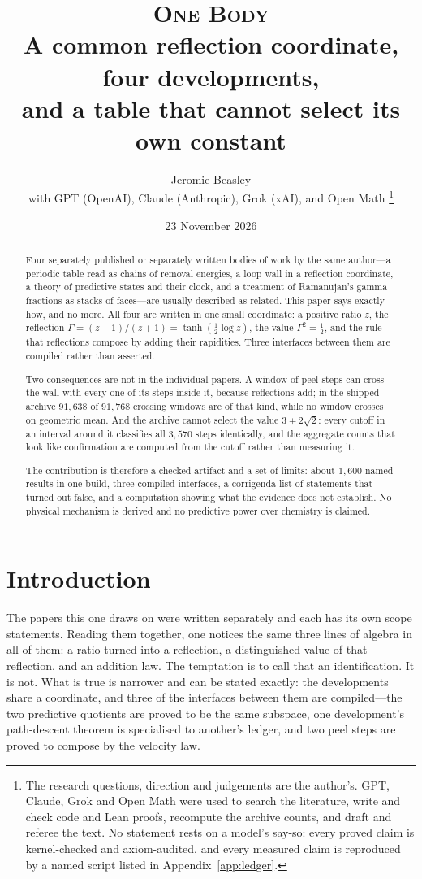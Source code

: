 \documentclass[11pt]{article}
\title{\textsc{One Body}\\A common reflection coordinate, four developments,\\and a table that cannot select its own constant}
\author{Jeromie Beasley\\[3pt]
{\small with GPT (OpenAI), Claude (Anthropic), Grok (xAI), and Open Math}%
\thanks{The research questions, direction and judgements are the author's. GPT, Claude, Grok and
Open Math were used to search the literature, write and check code and Lean proofs, recompute the
archive counts, and draft and referee the text. No statement rests on a model's say-so: every
proved claim is kernel-checked and axiom-audited, and every measured claim is reproduced by a
named script listed in Appendix~\ref{app:ledger}.}}
\date{23 November 2026}
\newcommand{\G}{\Gamma}
\renewcommand{\_}{\origunderscore\allowbreak}
\newcommand{\W}{3+2\sqrt{2}}
\begin{document}
\maketitle

\begin{abstract}
\noindent
Four separately published or separately written bodies of work by the same author---a periodic
table read as chains of removal energies, a loop wall in a reflection coordinate, a theory of
predictive states and their clock, and a treatment of Ramanujan's gamma fractions as stacks of
faces---are usually described as related. This paper says exactly how, and no more. All four are
written in one small coordinate: a positive ratio $z$, the reflection
$\G=(z-1)/(z+1)=\tanh(\tfrac12\log z)$, the value $\G^2=\tfrac12$, and the rule that reflections
compose by adding their rapidities. Three interfaces between them are compiled rather than
asserted.

Two consequences are not in the individual papers. A window of peel steps can cross the wall with
every one of its steps inside it, because reflections add; in the shipped archive $91{,}638$ of
$91{,}768$ crossing windows are of that kind, while no window crosses on geometric mean. And the
archive cannot select the value $\W$: every cutoff in an interval around it classifies all
$3{,}570$ steps identically, and the aggregate counts that look like confirmation are computed
from the cutoff rather than measuring it.

The contribution is therefore a checked artifact and a set of limits: about $1{,}600$ named
results in one build, three compiled interfaces, a corrigenda list of statements that turned out
false, and a computation showing what the evidence does not establish. No physical mechanism is
derived and no predictive power over chemistry is claimed.
\end{abstract}

\section{Introduction}

The papers this one draws on were written separately and each has its own scope statements.
Reading them together, one notices the same three lines of algebra in all of them: a ratio turned
into a reflection, a distinguished value of that reflection, and an addition law. The temptation
is to call that an identification. It is not. What is true is narrower and can be stated exactly:
the developments share a coordinate, and three of the interfaces between them are compiled---the
two predictive quotients are proved to be the same subspace, one development's path-descent
theorem is specialised to another's ledger, and two peel steps are proved to compose by the
velocity law.
\end{document}
